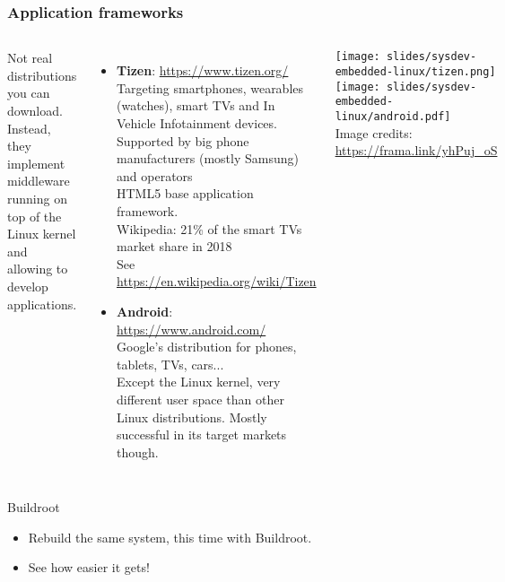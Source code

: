 \begin{frame}
  \frametitle{Application frameworks}
  \small
  \begin{columns}
    Not real distributions you can download. Instead, they
    implement middleware running on top of the Linux kernel
    and allowing to develop applications.
    \begin{itemize}
    \item {\bf Tizen}: \url{https://www.tizen.org/} \\
      Targeting smartphones, wearables (watches), smart TVs and
      In Vehicle Infotainment devices.\\
      Supported by big phone manufacturers (mostly Samsung) and operators \\
      HTML5 base application framework. \\
      Wikipedia: 21\% of the smart TVs market share in 2018 \\
      See \url{https://en.wikipedia.org/wiki/Tizen}
    \item {\bf Android}: \url{https://www.android.com/}\\
      Google's distribution for phones, tablets, TVs, cars...\\
      Except the Linux kernel, very different user space
      than other Linux distributions. Mostly successful in its target
      markets though.
    \end{itemize}
    \vspace{1.5cm}
    \texttt{[image: slides/sysdev-embedded-linux/tizen.png]}\\
    \vspace{1.5cm}
    \texttt{[image: slides/sysdev-embedded-linux/android.pdf]}\\
    \vspace{0.5cm}
    \tiny Image credits:\\
    \url{https://frama.link/yhPuj_oS}
  \end{columns}
\end{frame}

\setuplabframe
{Buildroot}
{
  \begin{itemize}
  \item Rebuild the same system, this time with Buildroot.
  \item See how easier it gets!
  \end{itemize}
}

